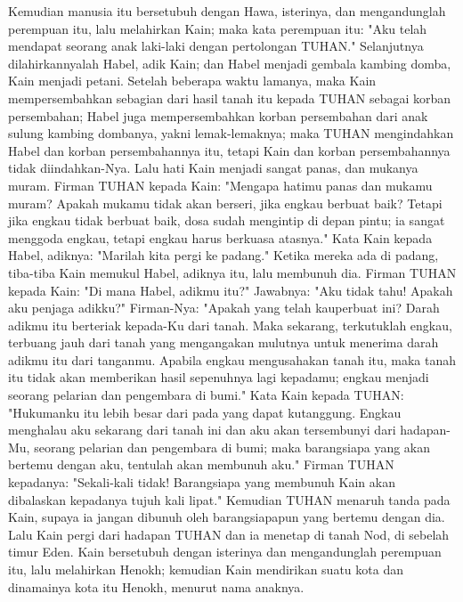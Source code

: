 \begin{biblechapter} %
 Kemudian manusia itu bersetubuh dengan Hawa, isterinya, dan mengandunglah perempuan itu, lalu melahirkan Kain; maka kata perempuan itu: "Aku telah mendapat seorang anak laki-laki dengan pertolongan TUHAN."
\verse Selanjutnya dilahirkannyalah Habel, adik Kain; dan Habel menjadi gembala kambing domba, Kain menjadi petani.
\verse Setelah beberapa waktu lamanya, maka Kain mempersembahkan sebagian dari hasil tanah itu kepada TUHAN sebagai korban persembahan;
\verse Habel juga mempersembahkan korban persembahan dari anak sulung kambing dombanya, yakni lemak-lemaknya; maka TUHAN mengindahkan Habel dan korban persembahannya itu,
\verse tetapi Kain dan korban persembahannya tidak diindahkan-Nya. Lalu hati Kain menjadi sangat panas, dan mukanya muram.
\verse Firman TUHAN kepada Kain: "Mengapa hatimu panas dan mukamu muram?
\verse Apakah mukamu tidak akan berseri, jika engkau berbuat baik? Tetapi jika engkau tidak berbuat baik, dosa sudah mengintip di depan pintu; ia sangat menggoda engkau, tetapi engkau harus berkuasa atasnya."
\verse Kata Kain kepada Habel, adiknya: "Marilah kita pergi ke padang." Ketika mereka ada di padang, tiba-tiba Kain memukul Habel, adiknya itu, lalu membunuh dia.
\verse Firman TUHAN kepada Kain: "Di mana Habel, adikmu itu?" Jawabnya: "Aku tidak tahu! Apakah aku penjaga adikku?"
\verse Firman-Nya: "Apakah yang telah kauperbuat ini? Darah adikmu itu berteriak kepada-Ku dari tanah.
\verse Maka sekarang, terkutuklah engkau, terbuang jauh dari tanah yang mengangakan mulutnya untuk menerima darah adikmu itu dari tanganmu.
\verse Apabila engkau mengusahakan tanah itu, maka tanah itu tidak akan memberikan hasil sepenuhnya lagi kepadamu; engkau menjadi seorang pelarian dan pengembara di bumi."
\verse Kata Kain kepada TUHAN: "Hukumanku itu lebih besar dari pada yang dapat kutanggung.
\verse Engkau menghalau aku sekarang dari tanah ini dan aku akan tersembunyi dari hadapan-Mu, seorang pelarian dan pengembara di bumi; maka barangsiapa yang akan bertemu dengan aku, tentulah akan membunuh aku."
\verse Firman TUHAN kepadanya: "Sekali-kali tidak! Barangsiapa yang membunuh Kain akan dibalaskan kepadanya tujuh kali lipat." Kemudian TUHAN menaruh tanda pada Kain, supaya ia jangan dibunuh oleh barangsiapapun yang bertemu dengan dia.
\verse Lalu Kain pergi dari hadapan TUHAN dan ia menetap di tanah Nod, di sebelah timur Eden.
 Kain bersetubuh dengan isterinya dan mengandunglah perempuan itu, lalu melahirkan Henokh; kemudian Kain mendirikan suatu kota dan dinamainya kota itu Henokh, menurut nama anaknya.

\end{biblechapter}
